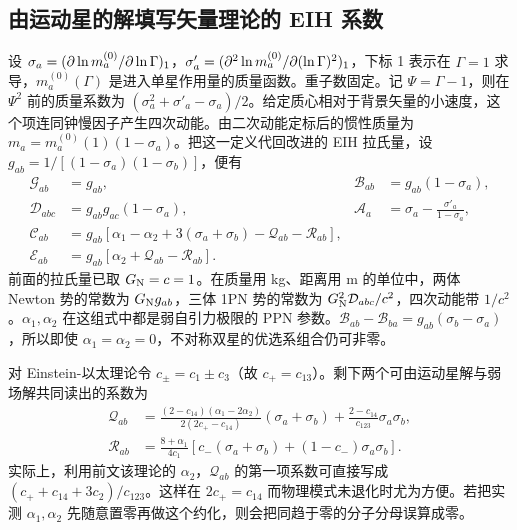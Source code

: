 \subsection{由运动星的解填写矢量理论的 EIH 系数}

设 $\sigma_a=(\partial\ln m_a^{(0)}/\partial\ln\Gamma)_1$，$\sigma'_a=(\partial^2\ln m_a^{(0)}/\partial(\ln\Gamma)^2)_1$，下标 1 表示在 $\Gamma=1$ 求导，$m_a^{(0)}(\Gamma)$ 是进入单星作用量的质量函数。重子数固定。记 $\Psi=\Gamma-1$，则在 $\Psi^2$ 前的质量系数为 $(\sigma_a^2+\sigma'_a-\sigma_a)/2$。给定质心相对于背景矢量的小速度，这个项连同钟慢因子产生四次动能。由二次动能定标后的惯性质量为 $m_a=m_a^{(0)}(1)(1-\sigma_a)$。把这一定义代回改进的 EIH 拉氏量，设 $g_{ab}=1/[(1-\sigma_a)(1-\sigma_b)]$，便有
\begin{align*}
 \mathcal G_{ab}&=g_{ab},&
 \mathcal B_{ab}&=g_{ab}(1-\sigma_a),\\
 \mathcal D_{abc}&=g_{ab}g_{ac}(1-\sigma_a),&
 \mathcal A_a&=\sigma_a-\frac{\sigma'_a}{1-\sigma_a},\\
 \mathcal C_{ab}&=g_{ab}
   [\alpha_1-\alpha_2+3(\sigma_a+\sigma_b)-\mathcal Q_{ab}-\mathcal R_{ab}],\\
 \mathcal E_{ab}&=g_{ab}[\alpha_2+\mathcal Q_{ab}-\mathcal R_{ab}].
\end{align*}
前面的拉氏量已取 $G_{\rm N}=c=1$。在质量用 kg、距离用 m 的单位中，两体 Newton 势的常数为 $G_{\rm N}g_{ab}$，三体 1PN 势的常数为 $G_{\rm N}^2\mathcal D_{abc}/c^2$，四次动能带 $1/c^2$。$\alpha_1,\alpha_2$ 在这组式中都是弱自引力极限的 PPN 参数。$\mathcal B_{ab}-\mathcal B_{ba}=g_{ab}(\sigma_b-\sigma_a)$，所以即使 $\alpha_1=\alpha_2=0$，不对称双星的优选系组合仍可非零。

对 Einstein-以太理论令 $c_\pm=c_1\pm c_3$（故 $c_+=c_{13}$）。剩下两个可由运动星解与弱场解共同读出的系数为
\begin{align*}
 \mathcal Q_{ab}&=
 \frac{(2-c_{14})(\alpha_1-2\alpha_2)}{2(2c_+-c_{14})}
      (\sigma_a+\sigma_b)
       +\frac{2-c_{14}}{c_{123}}\sigma_a\sigma_b,\\
 \mathcal R_{ab}&=\frac{8+\alpha_1}{4c_1}
       [c_-(\sigma_a+\sigma_b)+(1-c_-)\sigma_a\sigma_b].
\end{align*}
实际上，利用前文该理论的 $\alpha_2$，$\mathcal Q_{ab}$ 的第一项系数可直接写成 $(c_++c_{14}+3c_2)/c_{123}$。这样在 $2c_+=c_{14}$ 而物理模式未退化时尤为方便。若把实测 $\alpha_1,\alpha_2$ 先随意置零再做这个约化，则会把同趋于零的分子分母误算成零。

